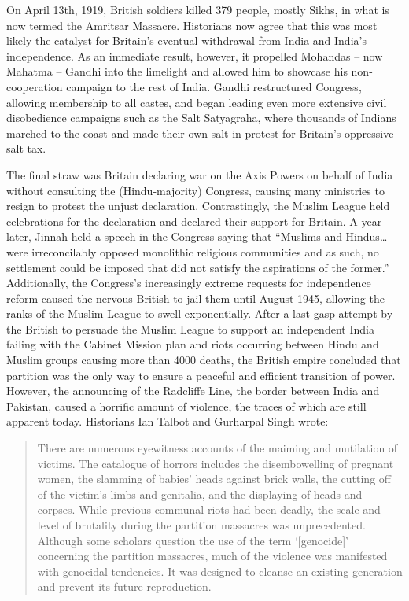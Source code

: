 \documentclass[11pt, letterpaper]{article}
\begin{document}
On April 13th, 1919, British soldiers killed 379 people, mostly Sikhs,
in what is now termed the Amritsar Massacre. Historians now agree that
this was most likely the catalyst for Britain's eventual withdrawal from
India and India's independence. As an immediate result, however, it
propelled Mohandas -- now Mahatma -- Gandhi into the limelight and
allowed him to showcase his non-cooperation campaign to the rest of
India. Gandhi restructured Congress, allowing membership to all castes,
and began leading even more extensive civil disobedience campaigns such
as the Salt Satyagraha, where thousands of Indians marched to the coast
and made their own salt in protest for Britain's oppressive salt tax.

The final straw was Britain declaring war on the Axis Powers on behalf
of India without consulting the (Hindu-majority) Congress, causing many
ministries to resign to protest the unjust declaration. Contrastingly,
the Muslim League held celebrations for the declaration and declared
their support for Britain. A year later, Jinnah held a speech in the
Congress saying that ``Muslims and Hindus\ldots were irreconcilably
opposed monolithic religious communities and as such, no settlement
could be imposed that did not satisfy the aspirations of the former.'' \cite{talbot}
Additionally, the Congress's increasingly extreme requests for
independence reform caused the nervous British to jail them until August
1945, allowing the ranks of the Muslim League to swell exponentially.
After a last-gasp attempt by the British to persuade the Muslim League
to support an independent India failing with the Cabinet Mission plan
and riots occurring between Hindu and Muslim groups causing more than
4000 deaths, the British empire concluded that partition was the only
way to ensure a peaceful and efficient transition of power. However, the
announcing of the Radcliffe Line, the border between India and Pakistan,
caused a horrific amount of violence, the traces of which are still
apparent today. Historians Ian Talbot and Gurharpal Singh wrote:

\begin{quote}
There are numerous eyewitness accounts of the maiming and mutilation of
victims. The catalogue of horrors includes the disembowelling of
pregnant women, the slamming of babies' heads against brick walls, the
cutting off of the victim's limbs and genitalia, and the displaying of
heads and corpses. While previous communal riots had been deadly, the
scale and level of brutality during the partition massacres was
unprecedented. Although some scholars question the use of the term
`{[}genocide{]}' concerning the partition massacres, much of the
violence was manifested with genocidal tendencies. It was designed to
    cleanse an existing generation and prevent its future reproduction. \cite{talbot} 
\end{quote}
\end{document}
